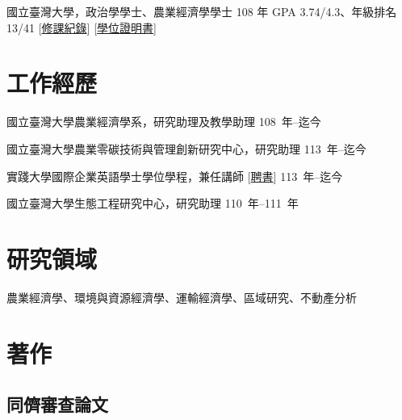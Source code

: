 \documentclass[11pt,letterpaper]{article}
\begin{document}
國立臺灣大學，政治學學士、農業經濟學學士 \hfill 108 年 \newline GPA
3.74/4.3、年級排名 13/41
{[}\href{https://yyliou.github.io/yyliou/cv/doc/bs-transcript-zh.pdf}{修課紀錄}{]}
{[}\href{https://yyliou.github.io/yyliou/cv/doc/bs-certificate-zh.pdf}{學位證明書}{]}

\section{工作經歷}\label{ux5de5ux4f5cux7d93ux6b77}

國立臺灣大學農業經濟學系，研究助理及教學助理 \hfill \mbox{108 年–迄今}

國立臺灣大學農業零碳技術與管理創新研究中心，研究助理
\hfill \mbox{113 年–迄今}

實踐大學國際企業英語學士學位學程，兼任講師
{[}\href{https://yyliou.github.io/yyliou/cv/doc/appointment-letters.pdf}{聘書}{]}
\hfill \mbox{113 年–迄今}

國立臺灣大學生態工程研究中心，研究助理 \hfill \mbox{110 年–111 年}

\section{研究領域}\label{ux7814ux7a76ux9818ux57df}

農業經濟學、環境與資源經濟學、運輸經濟學、區域研究、不動產分析

\section{著作}\label{ux8457ux4f5c}

\subsection{\texorpdfstring{\textbf{同儕審查論文}}{同儕審查論文}}\label{ux540cux5115ux5be9ux67e5ux8ad6ux6587}
\end{document}
